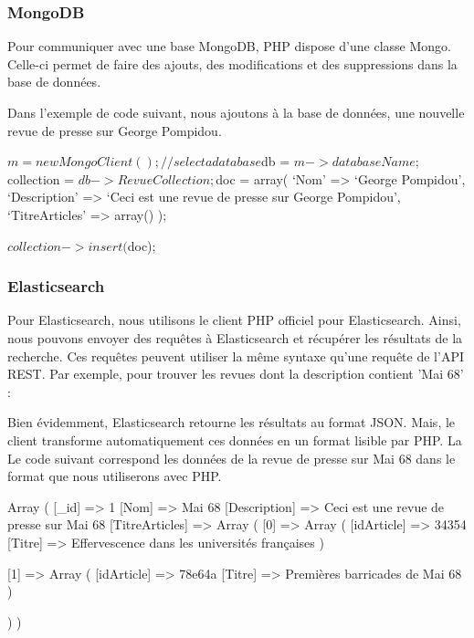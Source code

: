 \subsubsection{MongoDB}

Pour communiquer avec une base MongoDB, PHP dispose d’une classe Mongo. Celle-ci permet de faire des ajouts, des modifications et des suppressions dans la base de données. 

Dans l'exemple de code suivant, nous ajoutons à la base de données, une nouvelle revue de presse sur George Pompidou.

\begin{verbatimtab}[3]
$m = new MongoClient();

// select a database
$db = $m->databaseName;   
$collection = $db->RevueCollection;

$doc = array(
	‘Nom’ => ‘George Pompidou’,
	‘Description’ => ‘Ceci est une revue de presse sur George Pompidou’,
	‘TitreArticles’ => array()
);

$collection->insert($doc);
\end{verbatimtab}


\subsubsection{Elasticsearch}

Pour Elasticsearch, nous utilisons le client PHP officiel pour Elasticsearch. Ainsi, nous pouvons envoyer des requêtes à Elasticsearch et récupérer les résultats de la recherche. Ces requêtes peuvent utiliser la même syntaxe qu’une requête de l’API REST. Par exemple, pour trouver les revues dont la description contient 'Mai 68' :


\newpage
Bien évidemment, Elasticsearch retourne les résultats au format JSON. Mais, le client transforme automatiquement ces données en un format lisible par PHP. La Le code suivant correspond les données de la revue de presse sur Mai 68 dans le format que nous utiliserons avec PHP.

\begin{verbatimtab}[3]
Array
(
 [_id] => 1
 [Nom] => Mai 68
 [Description] => Ceci est une revue de presse sur Mai 68
 [TitreArticles] => Array
   (
		[0] => Array
		 (
			[idArticle] => 34354
			[Titre] => Effervescence dans les universités françaises
	   )

		[1] => Array
		 (
			[idArticle] => 78e64a
			[Titre] => Premières barricades de Mai 68
		 )

	)	
)
\end{verbatimtab}
